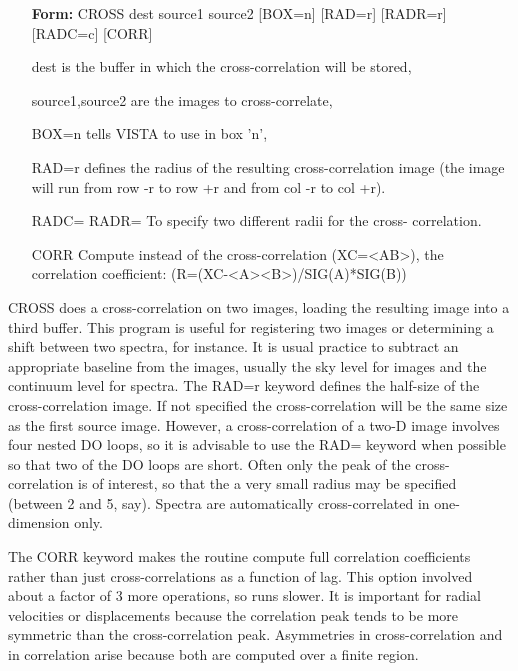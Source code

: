 \begin{itemize}
  \item[\textbf{Form: }CROSS dest source1 source2 {[BOX=n]} {[RAD=r]} {[RADR=r]} {[RADC=c]} {[CORR]}\hfill]{}
  \item[dest]{is the buffer in which the cross-correlation will be stored,}
  \item[source1,source2]{are the images to cross-correlate,}
  \item[BOX=n]{tells VISTA to use in box 'n',}
  \item[RAD=r]{defines the radius of the resulting cross-correlation image 
       (the image will run from row -r to row +r and from col -r to col +r).}
  \item[RADC= RADR=]{To specify two different radii for the cross-
       correlation.}
  \item[CORR]{Compute instead of the cross-correlation (XC=<AB>), 
              the correlation coefficient: (R=(XC-<A><B>)/SIG(A)*SIG(B))}
\end{itemize}

CROSS does a cross-correlation on two images, loading the resulting image
into a third buffer.  This program is useful for registering two images or
determining a shift between two spectra, for instance. It is usual practice
to subtract an appropriate baseline from the images, usually the sky level
for images and the continuum level for spectra. The RAD=r keyword defines
the half-size of the cross-correlation image. If not specified the
cross-correlation will be the same size as the first source image.
However, a cross-correlation of a two-D image involves four nested DO
loops, so it is advisable to use the RAD= keyword when possible so that two
of the DO loops are short.  Often only the peak of the cross-correlation is
of interest, so that the a very small radius may be specified (between 2
and 5, say).  Spectra are automatically cross-correlated in one-dimension
only.
 
The CORR keyword makes the routine compute full correlation coefficients
rather than just cross-correlations as a function of lag. This option
involved about a factor of 3 more operations, so runs slower. It is
important for radial velocities or displacements because the correlation
peak tends to be more symmetric than the cross-correlation
peak. Asymmetries in cross-correlation and in correlation arise because
both are computed over a finite region.

